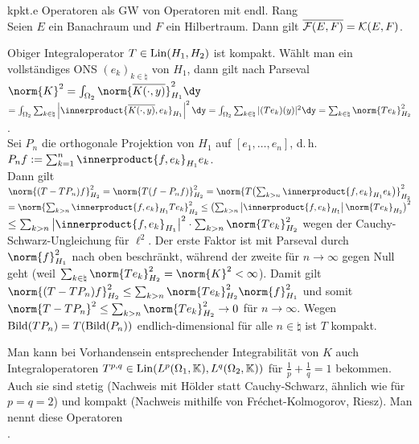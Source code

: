 \begin{Lemma}{kpkt.e Operatoren als GW von Operatoren mit endl. Rang}\\
    Seien $E$ ein Banachraum und $F$ ein Hilbertraum.
    Dann gilt $\overline{\mathcal{F}(E, F)} = \mathcal{K}(E, F)$.
\end{Lemma}

\linie
\pagebreak

\begin{Bsp}
    Obiger Integraloperator $T \in \operatorname{Lin}(H_1, H_2)$ ist kompakt.
    Wählt man ein vollständiges ONS $(e_k)_{k \in \natural}$ von $H_1$, dann gilt nach
    Parseval
    $\norm{K}^2 = \int_{\Omega_2} \norm{\overline{K(\cdot, y)}}_{H_1}^2 \dy$\\
    $= \int_{\Omega_2} \sum_{k \in \natural}
    \left|\innerproduct{\overline{K(\cdot, y)}, e_k}_{H_1}\right|^2 \dy
    = \int_{\Omega_2} \sum_{k \in \natural} |(Te_k)(y)|^2 \dy
    = \sum_{k \in \natural} \norm{Te_k}_{H_2}^2$.\\
    Sei $P_n$ die orthogonale Projektion von $H_1$ auf $[e_1, \dotsc, e_n]$, d.\,h.
    $P_n f := \sum_{k=1}^n \innerproduct{f, e_k}_{H_1} e_k$.\\
    Dann gilt
    $\norm{(T - TP_n) f}_{H_2}^2
    = \norm{T (f - P_n f)}_{H_2}^2
    = \norm{T\!\left(\sum_{k > n} \innerproduct{f, e_k}_{H_1} e_k\right)}_{H_2}^2$\\
    $= \norm{\sum_{k > n} \innerproduct{f, e_k}_{H_1} Te_k}_{H_2}^2
    \le \left(\sum_{k > n} \left|\innerproduct{f, e_k}_{H_1}\right| \norm{Te_k}_{H_2}\right)^2$\\
    $\le \sum_{k > n} \left|\innerproduct{f, e_k}_{H_1}\right|^2 \cdot \sum_{k > n} \norm{Te_k}_{H_2}^2$
    wegen der Cauchy-Schwarz-Ungleichung für $\ell^2$.
    Der erste Faktor ist mit Parseval durch $\norm{f}_{H_1}^2$ nach oben beschränkt, während
    der zweite für $n \to \infty$ gegen Null geht
    (weil $\sum_{k \in \natural} \norm{Te_k}_{H_2}^2 = \norm{K}^2 < \infty$).
    Damit gilt\\
    $\norm{(T - TP_n) f}_{H_2}^2 \le \sum_{k > n} \norm{Te_k}_{H_2}^2
    \norm{f}_{H_1}^2$
    und somit $\norm{T - TP_n}^2 \le \sum_{k > n} \norm{Te_k}_{H_2}^2 \to 0$
    für $n \to \infty$.
    Wegen $\text{Bild}(TP_n) = T(\text{Bild}(P_n))$ endlich-dimensional für alle $n \in \natural$ ist
    $T$ kompakt.
\end{Bsp}

\begin{Bem}
    Man kann bei Vorhandensein entsprechender Integrabilität von $K$ auch Integraloperatoren
    $T^{p,q} \in \operatorname{Lin}(L^p(\Omega_1, \mathbb{K}), L^q(\Omega_2, \mathbb{K}))$ für $\frac{1}{p} + \frac{1}{q} = 1$
    bekommen.
    Auch sie sind stetig (Nachweis mit Hölder statt Cauchy-Schwarz, ähnlich wie für $p = q = 2$)
    und kompakt (Nachweis mithilfe von Fréchet-Kolmogorov, Riesz).
    Man nennt diese Operatoren\\
    .
\end{Bem}

